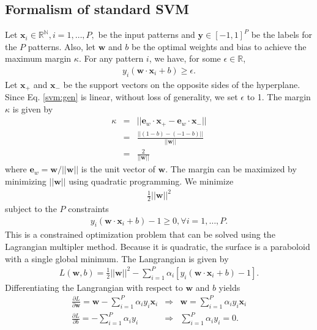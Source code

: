 \documentclass[11pt]{article}
\renewcommand{\[}{\begin{equation}}
\renewcommand{\]}{\end{equation}}
\begin{document}
\subsection*{Formalism of standard SVM}
Let $\textbf{x}_i\in\mathbb{R^N}, i=1,\ldots,P,$ be the input patterns and $\textbf{y}\in[-1,1]^P$ be the labels for the $P$ patterns. Also, let $\textbf{w}$ and $b$ be the optimal weights and bias to achieve the maximum margin $\kappa$. For any pattern $i$, we have, for some $\epsilon\in\mathbb{R}$,
\begin{eqnarray}
y_i(\textbf{w}\cdot\textbf{x}_i+b) \geq \epsilon.
\label{svm:gen}
\end{eqnarray}
Let $\textbf{x}_+$ and $\textbf{x}_-$ be the support vectors on the opposite sides of the hyperplane. Since Eq. \ref{svm:gen} is linear, without loss of generality, we set $\epsilon$ to 1. The margin $\kappa$ is given by
\begin{eqnarray}
\kappa &=& ||\textbf{e}_w\cdot\textbf{x}_+ - \textbf{e}_w\cdot\textbf{x}_-|| \nonumber\\
&=& \frac{||(1-b)-(-1-b)||}{||\textbf{w}||}\nonumber\\
&=& \frac{2}{||\textbf{w}||}
\end{eqnarray}
where $\textbf{e}_w=\textbf{w}/||\textbf{w}||$ is the unit vector of $\textbf{w}$. The margin can be maximized by minimizing $||\textbf{w}||$ using quadratic programming. We minimize 
\begin{eqnarray}
\frac{1}{2}||\textbf{w}||^2
\end{eqnarray}
subject to the $P$ constraints
\begin{eqnarray}
y_i(\textbf{w}\cdot\textbf{x}_i+b) - 1 \geq 0, \forall i=1,\ldots,P.
\end{eqnarray}
This is a constrained optimization problem that can be solved using the Lagrangian multipler method. Because it is quadratic, the surface is a paraboloid with a single global minimum. The Langrangian is given by
\begin{eqnarray}
L(\textbf{w},b) = \frac{1}{2}||\textbf{w}||^2 - \sum_{i=1}^{P}\alpha_i[y_i(\textbf{w}\cdot\textbf{x}_i+b) - 1].
\end{eqnarray}
Differentiating the Langrangian with respect to $\textbf{w}$ and $b$ yields
\begin{eqnarray}
\frac{\partial L}{\partial \textbf{w}} = \textbf{w} - \sum_{i=1}^{P}\alpha_iy_i\textbf{x}_i  &\Rightarrow&  \textbf{w} = \sum_{i=1}^{P}\alpha_iy_i\textbf{x}_i\\
\frac{\partial L}{\partial b} = - \sum_{i=1}^{P}\alpha_iy_i  &\Rightarrow&  \sum_{i=1}^{P}\alpha_iy_i  = 0.
\end{eqnarray}
\end{document}
